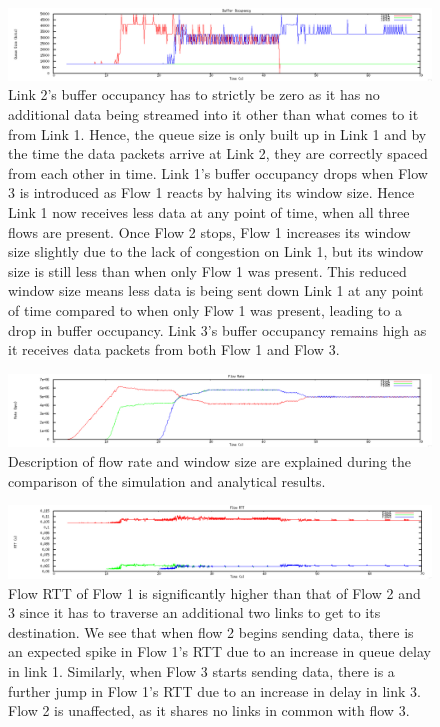 \documentclass[12pt]{article}
\begin{document}
\newpage


\begin{figure}[!ht]
\centering \includegraphics[bb= 0 0 1300 250, scale=.35]{figures/Test2_Vegas/buffer_occ.png}
\caption{Link 2’s buffer occupancy has to strictly be zero as it has no additional data being streamed into it other than what comes to it from Link 1. Hence, the queue size is only built up in Link 1 and by the time the data packets arrive at Link 2, they are correctly spaced from each other in time.
Link 1’s buffer occupancy drops when Flow 3 is introduced as Flow 1 reacts by halving its window size. Hence Link 1 now receives less data at any point of time, when all three flows are present. Once Flow 2 stops, Flow 1 increases its window size slightly due to the lack of congestion on Link 1, but its window size is still less than when only Flow 1 was present. This reduced window size means less data is being sent down Link 1 at any point of time compared to when only Flow 1 was present, leading to a drop in buffer occupancy.
Link 3’s buffer occupancy remains high as it receives data packets from both Flow 1 and Flow 3.  }
\label{fig:test2_vegas_buffer_occ}
\end{figure}

\begin{figure}[!ht]
\centering \includegraphics[bb= 0 0 1300 250, scale=.35]{figures/Test2_Vegas/flow_rate.png}
\caption{Description of flow rate and window size are explained during the comparison of the simulation and analytical results. }
\label{fig:test2_vegas_flow_rate}
\end{figure}

\begin{figure}[!ht]
\centering \includegraphics[bb= 0 0 1300 250, scale=.35]{figures/Test2_Vegas/flow_rtt.png}
\caption{Flow RTT of Flow 1 is significantly higher than that of Flow 2 and 3 since it has to traverse an additional two links to get to its destination.  We see that when flow 2 begins sending data, there is an expected spike in Flow 1’s RTT due to an increase in queue delay in link 1. Similarly, when Flow 3 starts sending data, there is a further jump in Flow 1’s RTT due to an increase in delay in link 3. Flow 2 is unaffected, as it shares no links in common with flow 3.}
\label{fig:test2_vegas_flow_rtt}
\end{figure}
\end{document}
